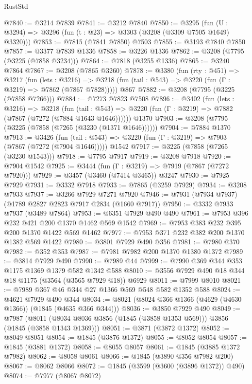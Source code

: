 \begin{lexlean}{RustStd}
\begin{coremodule}
@7840 := @3214 @7839
@7841 := @3212 @7840
@7850 := @3295 (fun (U : @3294) => @3296 (fun (t : @23) => @3303 (@3208 (@3309 @7505 @1649) @3320)))
@7853 := @7815 (@7841 @7850) @7503
@7855 := @3193 @7840 @7850
@7857 := @3377 @7839 @1336
@7858 := @3226 @1336
@7862 := @3208 (@7795 (@3225 (@7858 @3234)))
@7864 := @7818 (@3255 @1336)
@7865 := @3240 @7864
@7867 := @3208 (@7865 @3260)
@7878 := @3380
    (fun (rty : @451) =>
    @3217
      (fun (lets : @3216) =>
      @3218 (fun (tail : @543) => @3220 (fun (Γ : @3219) => @7862 (@7867 @7828)))))
    @867
@7882 := @3208 (@7795 (@3225 (@7858 @7266)))
@7884 := @7273 @7823 @7508
@7896 := @3402
    (fun (lets : @3216) =>
    @3218
      (fun (tail : @543) => @3220 (fun (Γ : @3219) => @7882 (@7867 (@7272 (@7884 @1643 @1646))))))
    @1370
@7903 := @3208 (@7795 (@3225 (@7858 (@7265 (@3230 (@1371 @1646))))))
@7904 := @7884 @1370
@7913 := @3426
    (fun (tail : @543) => @3220 (fun (Γ : @3219) => @7903 (@7867 (@7272 (@7904 @1646)))))
    @1542
@7917 := @3225 (@7858 (@7265 (@3230 @1543)))
@7918 := @7795 @7917
@7919 := @3208 @7918
@7920 := @7904 @1542
@7925 := @3444 (fun (Γ : @3219) => @7919 (@7867 (@7272 @7920)))
@7929 := @3457 (@3460 (@7414 @3465)) @3247
@7930 := @7925 @7929
@7931 := @3332 @7918
@7933 := @7865 (@3259 @7929)
@7934 := @3208 @7933
@7937 := @3266 @7929 @7271 @7920
@7946 := @7931 (@7934 @7937) (@1789 @2827 @2823 @7917 @2834 (@1660 @7917))
@7950 := @3332 @7933 @7937 (@3489 @7864)
@7953 := @6351 @7929 @490 @490
@7961 := @7953 @396 @232 @421 @200 @1370 @1462 @569 @1542
@7969 := @7953 @383 @232 @395 @200 @1370 @1422 @569 @1462
@7977 := @7953 @371 @232 @382 @200 @1370 @1382 @569 @1422
@7980 := @3801 @7929 @490 @356
@7981 := @7980 @370
@7982 := @352 @353
@7987 := @7981 @7982 @200 @1370 @1380 @1372
@7989 := @3814 @7929 @490
@7990 := @7989 @44
@7999 := @7990 @369 @344 @353 @1175 @1369 @1379 @582 @1342 @588
@8010 := @3556 @7929 @490 @18 @344 @18 @1175 (@3564 (@3565 @7929 @18)) @6929
@8011 := @7999 @8010
@8021 := @7989 @367 @46 @344 @27 @1366 @569 @548 @582 @1352 @588
@8024 := @4621 @7929 @490 @344
@8034 := @8021 (@8024 @366 @1366 (@4629 (@4630 @1366)) (@1845 (@4635 @366 @344)))
@8036 := @3850 @7929 @490
@8049 := @7987
    (@8011 (@8034 @8036 @3856 (@1845 (@3858 @1353 @569))) @3856 (@1845 (@3858 @1343 @1369)))
@8051 := @3871 (@3872 @1372)
@8052 := @8049 @8051
@8054 := @1845 (@3876 @1372)
@8055 := @8052 @8054
@8057 := @1845 (@3881 @1372)
@8058 := @8055 @8057
@8061 := @1845 (@3885 @1372 @7982)
@8062 := @8058 @8061
@8066 := @1845 (@3890 @356 @7982 @200)
@8067 := @8062 @8066
@8072 := @1845 (@3599 (@3600 (@3896 @1372)) @490)
@8074 := @7977 (@8067 @8072)

\end{coremodule}
\end{lexlean}
